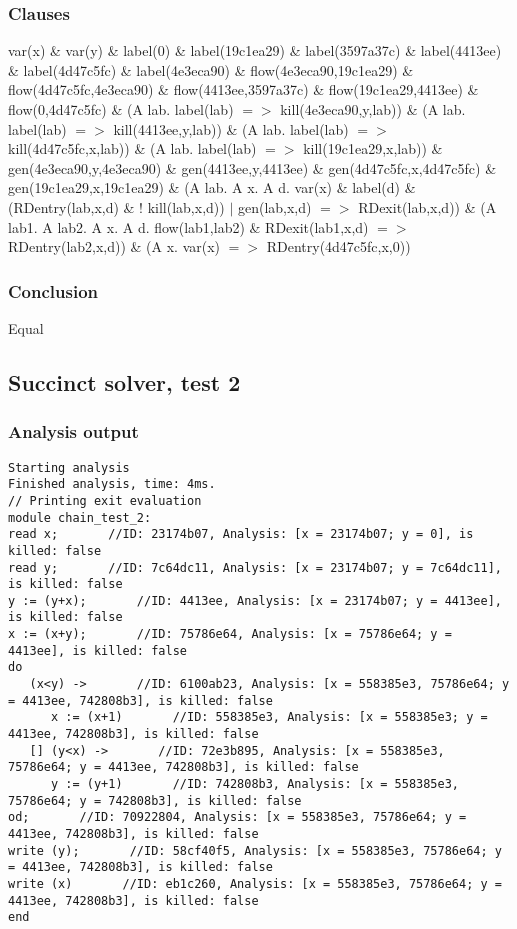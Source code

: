 \documentclass{report}
\begin{document}
\subsubsection{Clauses}
var(x) \& var(y) \& 
label(0) \& label(19c1ea29) \& label(3597a37c) \& label(4413ee) \& label(4d47c5fc) \& label(4e3eca90) \& 
flow(4e3eca90,19c1ea29) \& flow(4d47c5fc,4e3eca90) \& flow(4413ee,3597a37c) \& flow(19c1ea29,4413ee) \& flow(0,4d47c5fc) \& 
(A lab. label(lab) $=>$ kill(4e3eca90,y,lab)) \& (A lab. label(lab) $=>$ kill(4413ee,y,lab)) \& (A lab. label(lab) $=>$ kill(4d47c5fc,x,lab)) \& (A lab. label(lab) $=>$ kill(19c1ea29,x,lab)) \& 
gen(4e3eca90,y,4e3eca90) \& gen(4413ee,y,4413ee) \& gen(4d47c5fc,x,4d47c5fc) \& gen(19c1ea29,x,19c1ea29) \& 
(A lab. A x. A d. var(x) \& label(d) \& (RDentry(lab,x,d) \& ! kill(lab,x,d)) $|$ gen(lab,x,d) $=>$ RDexit(lab,x,d)) \& 
(A lab1. A lab2. A x. A d. flow(lab1,lab2) \& RDexit(lab1,x,d) $=>$ RDentry(lab2,x,d)) \& 
(A x. var(x) $=>$ RDentry(4d47c5fc,x,0))
\subsubsection{Conclusion}
Equal

\subsection{Succinct solver, test 2}
\subsubsection{Analysis output}
\begin{lstlisting}
Starting analysis
Finished analysis, time: 4ms.
// Printing exit evaluation
module chain_test_2:
read x;       //ID: 23174b07, Analysis: [x = 23174b07; y = 0], is killed: false
read y;       //ID: 7c64dc11, Analysis: [x = 23174b07; y = 7c64dc11], is killed: false
y := (y+x);       //ID: 4413ee, Analysis: [x = 23174b07; y = 4413ee], is killed: false
x := (x+y);       //ID: 75786e64, Analysis: [x = 75786e64; y = 4413ee], is killed: false
do
   (x<y) ->       //ID: 6100ab23, Analysis: [x = 558385e3, 75786e64; y = 4413ee, 742808b3], is killed: false
      x := (x+1)       //ID: 558385e3, Analysis: [x = 558385e3; y = 4413ee, 742808b3], is killed: false
   [] (y<x) ->       //ID: 72e3b895, Analysis: [x = 558385e3, 75786e64; y = 4413ee, 742808b3], is killed: false
      y := (y+1)       //ID: 742808b3, Analysis: [x = 558385e3, 75786e64; y = 742808b3], is killed: false
od;       //ID: 70922804, Analysis: [x = 558385e3, 75786e64; y = 4413ee, 742808b3], is killed: false
write (y);       //ID: 58cf40f5, Analysis: [x = 558385e3, 75786e64; y = 4413ee, 742808b3], is killed: false
write (x)       //ID: eb1c260, Analysis: [x = 558385e3, 75786e64; y = 4413ee, 742808b3], is killed: false
end
\end{lstlisting}
\end{document}
